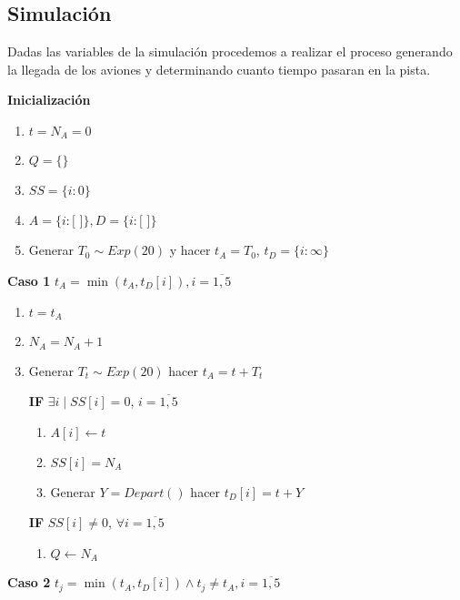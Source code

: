 \documentclass[a4paper,10pt,twocolumn]{article}
\begin{document}
	\subsection{Simulaci\'on}\label{sub:figures}
		
		Dadas las variables de la simulaci\'on procedemos a realizar el proceso generando la llegada de los aviones y determinando cuanto tiempo pasaran en la pista.
		
		\newpage
		
		\textbf{Inicializaci\'on}
		\begin{enumerate}
			\item[] $t = N_{A} = 0$
			\item[] $Q = \{\}$
			\item[] $SS = \{i: 0\}$
			\item[] $A = \{i: \text{[ ]}\}, D = \{i: \text{[ ]}\}$
			\item[] Generar $T_{0} \sim Exp(20)$ y hacer $t_{A} = T_{0}$, $t_{D} = \{i: \infty\}$
		\end{enumerate}

		\textbf{Caso 1} $ t_{A} = \min{( t_{A}, t_{D}[i] )}, i = \overline{1,5}$
		
		\begin{enumerate}
			\item[] $t = t_{A}$
			\item[] $N_{A} = N_{A} + 1$
			\item[] Generar $T_{t} \sim Exp(20)$ hacer $t_{A} = t + T_{t}$
			
			\textbf{IF} $\exists i \; | \; SS[i] = 0$, $i = \overline{1,5}$
				\begin{enumerate}
					\item[] $A[i] \leftarrow t$
					\item[] $SS[i] = N_{A}$
					\item[] Generar $Y = Depart()$ hacer $t_{D}[i] = t + Y$ 
				\end{enumerate}
			
			\textbf{IF} $SS[i] \neq 0$, $\forall i = \overline{1,5}$
			\begin{enumerate}
				\item[] $Q \leftarrow N_{A}$ 
			\end{enumerate}
		\end{enumerate}
	
		\textbf{Caso 2} $ t_{j} = \min{( t_{A}, t_{D}[i] )} \wedge t_{j} \neq t_{A}, i = \overline{1,5}$
		
\end{document}
